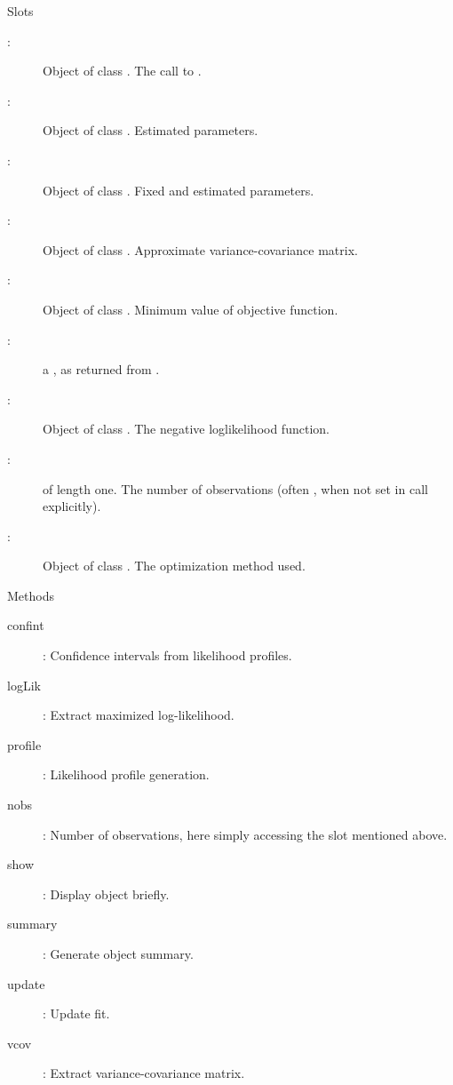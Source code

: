 %
\begin{Section}{Slots}
\begin{description}

\item[:] Object of class .
The call to .
\item[:] Object of class .  Estimated
parameters.
\item[:] Object of class .
Fixed and estimated parameters.
\item[:] Object of class .  Approximate
variance-covariance matrix.
\item[:] Object of class .  Minimum value
of objective function.
\item[:] a , as returned from
.
\item[:] Object of class .  The
negative loglikelihood function.
\item[:]  of length one.  The
number of observations (often , when not set in call
explicitly).
\item[:] Object of class .  The
optimization method used.

\end{description}

\end{Section}
%
\begin{Section}{Methods}
\begin{description}

\item[confint] : Confidence
intervals from likelihood profiles.
\item[logLik] : Extract maximized
log-likelihood.
\item[profile] : Likelihood profile
generation.
\item[nobs] : Number of
observations, here simply accessing the  slot mentioned above.
\item[show] : Display object briefly.
\item[summary] : Generate object summary.
\item[update] :  Update fit.
\item[vcov] : Extract
variance-covariance matrix.

\end{description}

\end{Section}
